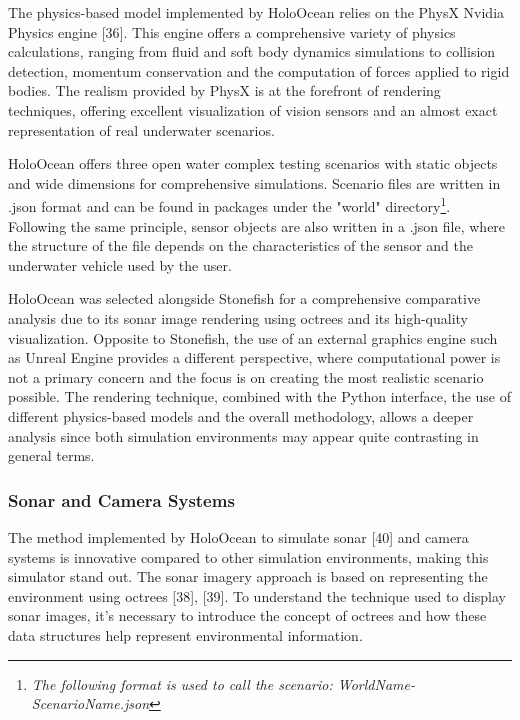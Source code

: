 \documentclass[]{article}
\begin{document}
	\newpage
	
	The physics-based model implemented by HoloOcean relies on the PhysX Nvidia Physics engine [36]. This engine offers a comprehensive variety of physics calculations, ranging from fluid and soft body dynamics simulations to collision detection, momentum conservation and the computation of forces applied to rigid bodies. The realism provided by PhysX is at the forefront of rendering techniques, offering excellent visualization of vision sensors and an almost exact representation of real underwater scenarios.
	
	HoloOcean offers three open water complex testing scenarios with static objects and wide dimensions for comprehensive simulations. Scenario files are written in .json format and can be found in packages under the "world" directory\footnote[9]{\textit{The following format is used to call the scenario: {WorldName}-{ScenarioName}.json}}. Following the same principle, sensor objects are also written in a .json file, where the structure of the file depends on the characteristics of the sensor and the underwater vehicle used by the user.
	
	HoloOcean was selected alongside Stonefish for a comprehensive comparative analysis due to its sonar image rendering using octrees and its high-quality visualization. Opposite to Stonefish, the use of an external graphics engine such as Unreal Engine provides a different perspective, where computational power is not a primary concern and the focus is on creating the most realistic scenario possible. The rendering technique, combined with the Python interface, the use of different physics-based models and the overall methodology, allows a deeper analysis since both simulation environments may appear quite contrasting in general terms.
	
	\subsubsection{Sonar and Camera Systems}
	
	The method implemented by HoloOcean to simulate sonar [40] and camera systems is innovative compared to other simulation environments, making this simulator stand out. The sonar imagery approach is based on representing the environment using octrees [38], [39]. To understand the technique used to display sonar images, it's necessary to introduce the concept of octrees and how these data structures help represent environmental information.
	
\end{document}
